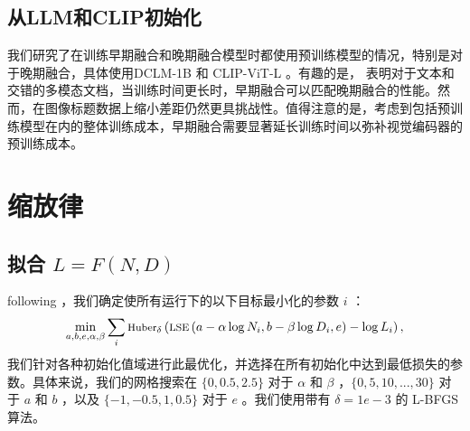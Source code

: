 \subsection{从LLM和CLIP初始化}
\label{sec:app_init_early_late}

我们研究了在训练早期融合和晚期融合模型时都使用预训练模型的情况，特别是对于晚期融合，具体使用DCLM-1B \citep{li2024datacomp} 和 CLIP-ViT-L \citep{radford2021learning}。有趣的是， 表明对于文本和交错的多模态文档，当训练时间更长时，早期融合可以匹配晚期融合的性能。然而，在图像标题数据上缩小差距仍然更具挑战性。值得注意的是，考虑到包括预训练模型在内的整体训练成本，早期融合需要显著延长训练时间以弥补视觉编码器的预训练成本。














                
                





\section{缩放律}
\label{app:scaling_laws}












\subsection{拟合 \(L = F(N, D)\) }  
following \citep{hoffmann2022training}，我们确定使所有运行下的以下目标最小化的参数 \(i\) ：  
\begin{equation}
\footnotesize
    \min_{a,b,e,\alpha,\beta} \sum_{i} \text{Huber}_\delta \left( \text{LSE} \left( a - \alpha \log N_i, b - \beta \log D_i, e \right) - \log L_i \right),
\end{equation}  
我们针对各种初始化值域进行此最优化，并选择在所有初始化中达到最低损失的参数。具体来说，我们的网格搜索在 \(\{0, 0.5, 2.5\}\)  对于 \(\alpha\)  和 \(\beta\) ，\(\{0, 5, 10, ..., 30\}\)  对于 \(a\)  和 \(b\) ，以及 \(\{-1, -0.5, 1, 0.5\}\)  对于 \(e\) 。我们使用带有 \(\delta=1e-3\) 的 L-BFGS 算法。  



